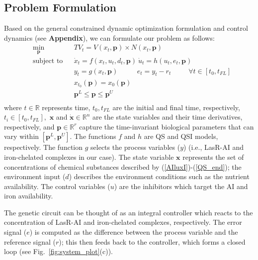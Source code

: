 \documentclass[runningheads]{llncs}
\begin{document}
\subsection{Problem Formulation}
Based on the general constrained dynamic optimization formulation and control dynamics (see \textbf{Appendix}), we can formulate our problem as follows:
\begin{equation}
\begin{aligned}
\label{optimization}
& \underset{\mathbf{p}}{\text{min}}
& & TV_{t} = V(x_t, \mathbf{p})\times N(x_t, \mathbf{p})  \\
& \text{subject to}
& & \dot{x}_{t} =  f(x_t, u_t, d_t, \mathbf{p}) \   \dot{u}_t =  h(u_t, e_t, \mathbf{p}) \\
&&& y_t =  g(x_t, \mathbf{p}) \hspace{33pt} e_t =  y_t - r_t  \hspace{30pt} \forall t \in [t_0, t_{FL}] \\
&&& x_{t_0}(\mathbf{p}) = x_0(\mathbf{p}) \\
&&& \mathbf{p}^L \leq \mathbf{p} \leq \mathbf{p}^U \\
\end{aligned}
\end{equation}
where $t \in \mathbb{R}$ represents time, $t_0, t_{FL}$ are the initial and final time, respectively, $t_i \in [t_0, t_{FL}],$ $\mathbf{x}$ and $\mathbf{\dot{x}} \in \mathbb{R}^n$ are the state variables and their time derivatives, respectively, and $\mathbf{p} \in \mathbb{R}^r$ capture the time-invariant biological parameters that can vary within $[\mathbf{p}^L, \mathbf{p}^U]$. The functions $f$ and $h$ are QS and QSI models, respectively.   The function $g$ selects the process variables ($y$) (i.e., LasR-AI and iron-chelated complexes in our case).  The state variable $\mathbf{x}$ represents the set of concentrations of chemical substances described by (\ref{AIluxI})-(\ref{QS_end}); the environment input ($d$) describes the environment conditions such as the nutrient availability. The control variables ($u$) are the inhibitors which target the AI and iron availability. 

The genetic circuit can be thought of as an integral controller which reacts to the concentration of LasR-AI and iron-chelated complexes, respectively. The error signal ($e$) is computed as the difference between the process variable and the reference signal ($r$); this then feeds back to the controller, which forms a closed loop (see Fig.~\ref{fig:system_plot}(c)).  
  
\end{document}
